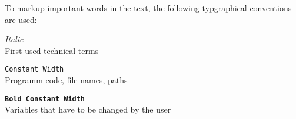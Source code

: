 To markup important words in the text, the following typgraphical conventions are used:

\begin{description}
\item \textit{Italic} \hfill \\
  First used technical terms
\item \texttt{Constant Width} \hfill \\
  Programm code, file names, paths
\item \textbf{\texttt{Bold Constant Width}} \hfill \\
  Variables that have to be changed by the user
\end{description}
